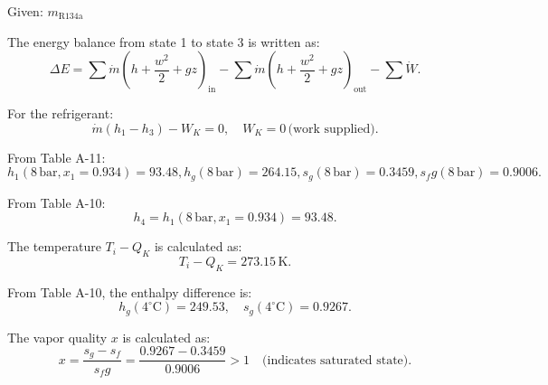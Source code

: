 Given: \( m_{\text{R134a}} \)  

The energy balance from state 1 to state 3 is written as:  
\[
\Delta E = \sum \dot{m} \left( h + \frac{w^2}{2} + gz \right)_{\text{in}} - \sum \dot{m} \left( h + \frac{w^2}{2} + gz \right)_{\text{out}} - \sum \dot{W}.
\]  

For the refrigerant:  
\[
\dot{m} \left( h_1 - h_3 \right) - W_K = 0, \quad W_K = 0 \, \text{(work supplied)}.
\]  

From Table A-11:  
\[
h_1 (8 \, \text{bar}, x_1 = 0.934) = 93.48,  
h_g (8 \, \text{bar}) = 264.15,  
s_g (8 \, \text{bar}) = 0.3459,  
s_fg (8 \, \text{bar}) = 0.9006.
\]  

From Table A-10:  
\[
h_4 = h_1 (8 \, \text{bar}, x_1 = 0.934) = 93.48.
\]  

The temperature \( T_i - Q_K \) is calculated as:  
\[
T_i - Q_K = 273.15 \, \text{K}.
\]  

From Table A-10, the enthalpy difference is:  
\[
h_g (4^\circ \text{C}) = 249.53, \quad s_g (4^\circ \text{C}) = 0.9267.
\]  

The vapor quality \( x \) is calculated as:  
\[
x = \frac{s_g - s_f}{s_fg} = \frac{0.9267 - 0.3459}{0.9006} > 1 \quad \text{(indicates saturated state)}.
\]